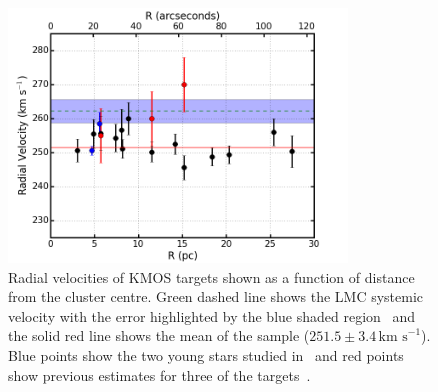 \documentclass[useAMS,usenatbib]{mn2e}
\def\kms{$\mbox{km s}^{-1}$}
\begin{document}
\begin{figure}
 \includegraphics[width=9.0cm]{NGC2100-rv-v8}
 \caption{Radial velocities of KMOS targets shown as a function of distance from the cluster centre.
 Green dashed line shows the LMC systemic velocity with the error highlighted by the blue shaded region~\citep[$262.2\pm3.4$\,\kms;][]{2012AJ....144....4M}
 and the solid red line shows the mean of the sample ($251.5\pm3.4\,$\kms).
 Blue points show the two young stars studied in~\cite{2015arXiv150803490E} and red points show previous estimates for three of the targets~\citep{1994A&A...282..717J}.
\label{fig:rvs}
          }
\end{figure}
\end{document}
